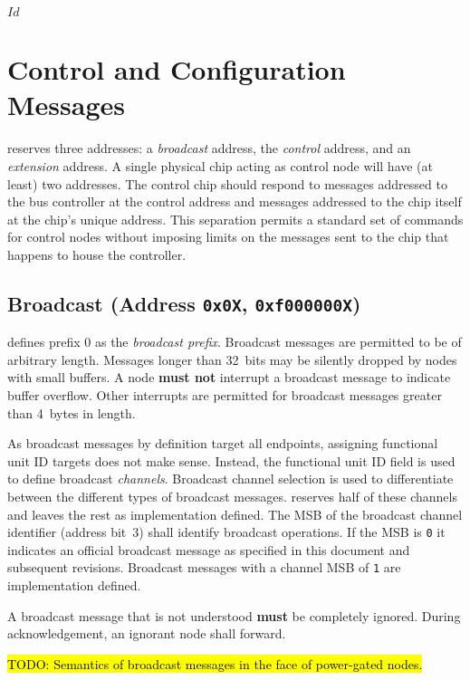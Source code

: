 \svnInfo $Id$

\section{Control and Configuration Messages}
\label{sec:control}

\bus reserves three addresses: a {\em broadcast} address, the {\em control}
address, and an {\em extension} address. A single physical chip acting as
control node will have (at least) two addresses. The control chip should
respond to messages addressed to the bus controller at the control address and
messages addressed to the chip itself at the chip's unique address. This
separation permits a standard set of commands for \bus control nodes without
imposing limits on the messages sent to the chip that happens to house the
\bus controller.

\subsection{Broadcast (Address \texttt{0x0X}, \texttt{0xf000000X})}
\label{sec:control-broadcast}
\bus defines prefix 0 as the \textit{broadcast prefix}. Broadcast messages
are permitted to be of arbitrary length. Messages longer than 32~bits may be
silently dropped by nodes with small buffers. A node \textbf{must not}
interrupt a broadcast message to indicate buffer overflow. Other interrupts
are permitted for broadcast messages greater than 4~bytes in length.

As broadcast messages by definition target all endpoints, assigning functional
unit ID targets does not make sense. Instead, the functional unit ID field is
used to define broadcast {\em channels}. Broadcast channel selection is used
to differentiate between the different types of broadcast messages. \bus
reserves half of these channels and leaves the rest as implementation defined.
%
The MSB of the broadcast channel identifier (address bit~3) shall identify
\bus broadcast operations. If the MSB is {\tt 0} it indicates an official \bus
broadcast message as specified in this document and subsequent revisions.
Broadcast messages with a channel MSB of {\tt 1} are implementation defined.

A broadcast message that is not understood \textbf{must} be completely
ignored. During acknowledgement, an ignorant node shall forward.

\hl{TODO: Semantics of broadcast messages in the face of power-gated nodes.}

